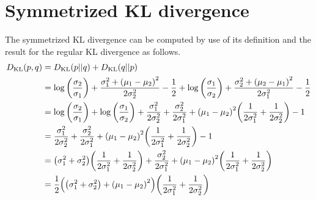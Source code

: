 \section{Symmetrized KL divergence}
The symmetrized \gls{KL} divergence can be computed by use of its definition and the result for the regular \gls{KL} divergence as follows.
\begin{align}
    D_\text{KL}(p,q)
    &= D_\text{KL}(p||q) + D_\text{KL}(q||p)\\
    &= \log{\left(\frac{\sigma_2}{\sigma_1}\right)} + \frac{\sigma_1^2+{\left(\mu_1-\mu_2\right)}^2}{2\sigma_2^2} - \frac{1}{2} + \log{\left(\frac{\sigma_1}{\sigma_2}\right)} + \frac{\sigma_2^2+{\left(\mu_2-\mu_1\right)}^2}{2\sigma_1^2} - \frac{1}{2}\\
    &= \log{\left(\frac{\sigma_2}{\sigma_1}\right)} + \log{\left(\frac{\sigma_1}{\sigma_2}\right)} + \frac{\sigma_1^2}{2\sigma_2^2} + \frac{\sigma_2^2}{2\sigma_1^2} + {\left(\mu_1-\mu_2\right)}^2{\left(\frac{1}{2\sigma_1^2}+\frac{1}{2\sigma_2^2}\right)} - 1\\
    &= \frac{\sigma_1^2}{2\sigma_2^2} + \frac{\sigma_2^2}{2\sigma_1^2} + {\left(\mu_1-\mu_2\right)}^2{\left(\frac{1}{2\sigma_1^2}+\frac{1}{2\sigma_2^2}\right)} - 1\\
    &= {\left(\sigma_1^2+\sigma_2^2\right)}{\left(\frac{1}{2\sigma_1^2}+\frac{1}{2\sigma_2^2}\right)} + \frac{\sigma_2^2}{2\sigma_1^2} + {\left(\mu_1-\mu_2\right)}^2{\left(\frac{1}{2\sigma_1^2}+\frac{1}{2\sigma_2^2}\right)}\\
    &= \frac{1}{2}{\left({\left(\sigma_1^2+\sigma_2^2\right)}+{\left(\mu_1-\mu_2\right)}^2\right)}{\left(\frac{1}{2\sigma_1^2}+\frac{1}{2\sigma_2^2}\right)}
\end{align}
 